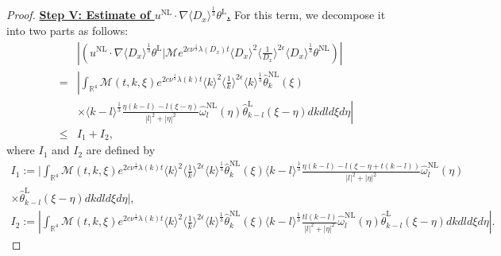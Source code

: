 \documentclass[reqno, 12pt]{amsart} %
\theoremstyle{plain} %
\theoremstyle{definition}
\theoremstyle{remark}
\numberwithin{equation}{section} %
\newcommand{\lt}{\left}
\newcommand{\rt}{\right}
\begin{document}
\begin{proof}
		
		\underline{\bf Step V: Estimate of $  u^{\mathrm{NL}} \cdot  \nabla \langle D_x \rangle^\frac13 \theta^{\mathrm{L}}$.} For this term, we decompose it into two parts as follows:
		\begin{equation}\begin{aligned} \label{eq:I1I2}
				& \left|\left(u^{\mathrm{NL}} \cdot \nabla \langle D_x \rangle^\frac13 \theta^{\mathrm{L}} \big| \mathcal{M} e^{2 c \nu^{\frac{1}{3}} \lambda\left(D_x\right) t}\langle D_x\rangle^2\langle\frac{1}{D_x}\rangle^{2 \epsilon} \langle D_x \rangle^\frac13 \theta^{\mathrm{NL}} \right)\right| \\
				= & \left|\int_{\mathbb{R}^4} \mathcal{M}(t, k, \xi) e^{2 c \nu^{\frac{1}{3}} \lambda(k) t}\langle k\rangle^2\langle\frac{1}{k}\rangle^{2 \epsilon} \langle k \rangle^\frac13\hat{\theta}_k^{\mathrm{NL}}(\xi) \rt. \\
				&\lt. \times \langle k-l \rangle^\frac13  \frac{\eta(k-l)-l(\xi-\eta)}{|l|^2+|\eta|^2} \hat{\omega}_l^{\mathrm{NL}}(\eta) \hat{\theta}_{k-l}^{\mathrm{L}}(\xi-\eta) d k d l d \xi d \eta\right| \\
				\leq & I_1+I_2,
		\end{aligned}\end{equation}
		where $I_1$ and $I_2$ are defined by
		$$
		\begin{gathered}
			I_1 :=\bigg| \int_{\mathbb{R}^4} \mathcal{M}(t, k, \xi) e^{2 c \nu^{\frac{1}{3}} \lambda(k) t}\langle k\rangle^2\langle\frac{1}{k}\rangle^{2 \epsilon} \langle k \rangle^\frac13\hat{\theta}_k^{\mathrm{NL}}(\xi) \langle k-l \rangle^\frac13  \frac{\eta(k-l)-l(\xi-\eta+t(k-l))}{|l|^2+|\eta|^2} \hat{\omega}_l^{\mathrm{NL}}(\eta) \\
			\times \hat{\theta}_{k-l}^{\mathrm{L}}(\xi-\eta) d k d l d \xi d \eta \bigg|, \\
			I_2 :=\left|\int_{\mathbb{R}^4} \mathcal{M}(t, k, \xi) e^{2 c \nu^{\frac{1}{3}} \lambda(k) t}\langle k\rangle^2\langle\frac{1}{k}\rangle^{2 \epsilon} \langle k \rangle^\frac13\hat{\theta}_k^{\mathrm{NL}}(\xi) \langle k-l \rangle^\frac13  \frac{t l(k-l)}{|l|^2+|\eta|^2} \hat{\omega}_l^{\mathrm{NL}}(\eta) \hat{\theta}_{k-l}^{\mathrm{L}}(\xi-\eta) d k d l d \xi d \eta\right| .
		\end{gathered}
		$$ 
		

\end{proof}
\end{document}
